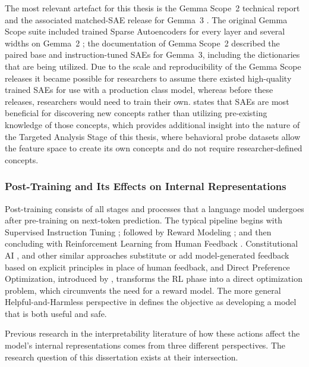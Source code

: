 The most relevant artefact for this thesis is the Gemma Scope~2 technical report and the associated matched-SAE release for Gemma~3 \parencite{mcdougall_gemma_scope_2_2025}. The original Gemma Scope suite included trained Sparse Autoencoders for every layer and several widths on Gemma~2 \parencite{lieberum_gemma_2024}; the documentation of Gemma Scope~2 described the paired base and instruction-tuned SAEs for Gemma~3, including the dictionaries that are being utilized. Due to the scale and reproducibility of the Gemma Scope releases it became possible for researchers to assume there existed high-quality trained SAEs for use with a production class model, whereas before these releases, researchers would need to train their own. \textcite{peng_use_2025} states that SAEs are most beneficial for discovering new concepts rather than utilizing pre-existing knowledge of those concepts, which provides additional insight into the nature of the Targeted Analysis Stage of this thesis, where behavioral probe datasets allow the feature space to create its own concepts and do not require researcher-defined concepts.

\subsubsection{Post-Training and Its Effects on Internal Representations}
\label{subsubsec:post-training-effects}

Post-training consists of all stages and processes that a language model undergoes after pre-training on next-token prediction. The typical pipeline begins with Supervised Instruction Tuning \parencite{wei_finetuned_2022, zhou_lima_2023}; followed by Reward Modeling \parencite{christiano_deep_2023, ziegler_fine-tuning_2020}; and then concluding with Reinforcement Learning from Human Feedback \parencite{ouyang_training_2022}. Constitutional AI \parencite{bai_constitutional_2022}, and other similar approaches substitute or add model-generated feedback based on explicit principles in place of human feedback, and Direct Preference Optimization, introduced by \textcite{rafailov_direct_2024}, transforms the RL phase into a direct optimization problem, which circumvents the need for a reward model. The more general Helpful-and-Harmless perspective in \textcite{bai_training_2022} defines the objective as developing a model that is both useful and safe.

Previous research in the interpretability literature of how these actions affect the model's internal representations comes from three different perspectives. The research question of this dissertation exists at their intersection.

